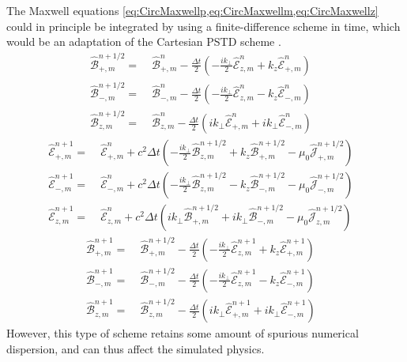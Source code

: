 \documentclass[1p,times]{elsarticle}
\newcommand{\tB}[2]{\spectral{B}_{#1,m}^{#2}}
\newcommand{\tE}[2]{\spectral{E}_{#1,m}^{#2}}
\newcommand{\tj}[2]{\spectral{J}_{#1,m}^{#2}}
\newcommand{\spectral}[1]{\hat{\mathcal{#1}}}
\begin{document}
The Maxwell equations
\cref{eq:CircMaxwellp,eq:CircMaxwellm,eq:CircMaxwellz} could in
principle be integrated by using a finite-difference scheme in time, 
which would be an adaptation of the Cartesian PSTD scheme \cite{Liu}.
\begin{subequations}
\label{eq:PSTD1}
\begin{align}
\tB{+}{n+1/2} = \; & \tB{+}{n} - 
\frac{\Delta t}{2}\left(-\frac{ik_\perp }{2} \tE{z}{n} + k_z\tE{+}{n}
\right) & \\
\tB{-}{n+1/2} =\; & \tB{-}{n} - 
\frac{\Delta t}{2}\left(- \frac{ik_\perp }{2} \tE{z}{n} - k_z\tE{-}{n}
\right) &\\
\tB{z}{n+1/2} =\; & \tB{z}{n} - 
\frac{\Delta t}{2}\left(ik_\perp \tE{+}{n} + ik_\perp \tE{-}{n}
\right) &
\end{align}
\end{subequations}
\begin{subequations}
\label{eq:PSTD2}
\begin{align}
\tE{+}{n+1} = \; & \tE{+}{n} + 
c^2\Delta t\left(-\frac{ik_\perp }{2} \tB{z}{n+1/2} + k_z\tB{+}{n+1/2}
- \mu_0 \tj{+}{n+1/2} \right) & \\
\tE{-}{n+1} =\; & \tE{-}{n} +
c^2\Delta t\left(- \frac{ik_\perp }{2} \tB{z}{n+1/2} - k_z\tB{-}{n+1/2}
- \mu_0 \tj{-}{n+1/2} \right) &\\
\tE{z}{n+1} =\; & \tE{z}{n} + 
c^2\Delta t\left(ik_\perp \tB{+}{n+1/2} + ik_\perp \tB{-}{n+1/2}
- \mu_0 \tj{z}{n+1/2} \right)  &
\end{align}
\end{subequations}
\begin{subequations}
\label{eq:PSTD3}
\begin{align}
\tB{+}{n+1} = \; & \tB{+}{n+1/2} - 
\frac{\Delta t}{2}\left(-\frac{ik_\perp }{2} \tE{z}{n+1} + k_z\tE{+}{n+1}
\right) & \\
\tB{-}{n+1} =\; & \tB{-}{n+1/2} - 
\frac{\Delta t}{2}\left(- \frac{ik_\perp }{2} \tE{z}{n+1} - k_z\tE{-}{n+1}
\right) &\\
\tB{z}{n+1} =\; & \tB{z}{n+1/2} - 
\frac{\Delta t}{2}\left(ik_\perp \tE{+}{n+1} + ik_\perp \tE{-}{n+1}
\right) &
\end{align}
\end{subequations}
However, this type of scheme retains some amount of spurious numerical
dispersion, and can thus affect the simulated physics.
\end{document}
